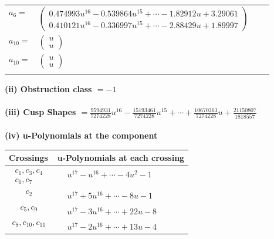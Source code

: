 \documentclass[1p]{elsarticle_modified}
\theoremstyle{definition}
\begin{document}
\begin{tabular}{m{7pt} m{180pt} m{7pt} m{180pt} }
\flushright $a_{6}=$&$\begin{pmatrix}0.474993 u^{16}-0.539864 u^{15}+\cdots-1.82912 u+3.29061\\0.410121 u^{16}-0.336997 u^{15}+\cdots-2.88429 u+1.89997\end{pmatrix}$ \\
\flushright $a_{10}=$&$\begin{pmatrix}u\\u\end{pmatrix}$\\ \flushright $a_{10}=$&$\begin{pmatrix}u\\u\end{pmatrix}$\\&\end{tabular}
\flushleft \textbf{(ii) Obstruction class $= -1$}\\~\\
\flushleft \textbf{(iii) Cusp Shapes $= \frac{9594931}{7274228} u^{16}-\frac{15193461}{7274228} u^{15}+\cdots+\frac{10670363}{7274228} u+\frac{21150807}{1818557}$}\\~\\
\newpage\renewcommand{\arraystretch}{1}
\flushleft \textbf{(iv) u-Polynomials at the component}\newline \\
\begin{tabular}{m{50pt}|m{274pt}}
Crossings & \hspace{64pt}u-Polynomials at each crossing \\
\hline $$\begin{aligned}c_{1},c_{3},c_{4}\\c_{6},c_{7}\end{aligned}$$&$\begin{aligned}
&u^{17}- u^{16}+\cdots-4 u^2-1
\end{aligned}$\\
\hline $$\begin{aligned}c_{2}\end{aligned}$$&$\begin{aligned}
&u^{17}+5 u^{16}+\cdots-8 u-1
\end{aligned}$\\
\hline $$\begin{aligned}c_{5},c_{9}\end{aligned}$$&$\begin{aligned}
&u^{17}-3 u^{16}+\cdots+22 u-8
\end{aligned}$\\
\hline $$\begin{aligned}c_{8},c_{10},c_{11}\end{aligned}$$&$\begin{aligned}
&u^{17}-2 u^{16}+\cdots+13 u-4
\end{aligned}$\\
\hline
\end{tabular}\\~\\
\end{document}
